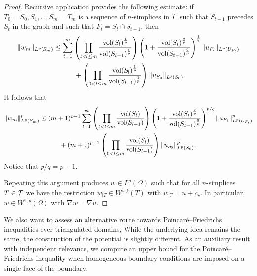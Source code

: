 \documentclass[a4paper]{article}
\begin{document}
\begin{proof}
 Recursive application provides the following estimate:
 if $T_0 = S_0, S_1, \dots, S_m = T_m$ is a sequence of $n$-simplices in ${\mathcal T}$
 such that \color{red}$S_{t-1}$ precedes $S_{t}$ in the graph \color{black} and such that $F_t = S_t \cap S_{t-1}$,
 then 
 \begin{align*}
    \| w_{m} \|_{L^{p}(S_m)}
    &\leq 
    \sum_{t=1}^{m} 
    \left( 
        \prod_{t < l \leq m} 
        \frac{ \operatorname{vol}(S_l)^{\frac 1 p} }{ \operatorname{vol}(S_{l-1})^{\frac 1 p} } 
    \right)
    \left( 1 + \frac{ \operatorname{vol}(S_t)^{\frac q p} }{ \operatorname{vol}(S_{t-1})^{\frac q p} } \right)^{\frac 1 q}
    \| u_{F_t} \|_{L^{p}(U_{F_t})}
    \\&\quad \quad \quad 
    +
    \left( 
        \prod_{0 < l \leq m} 
        \frac{ \operatorname{vol}(S_l)^{\frac 1 p} }{ \operatorname{vol}(S_{l-1})^{\frac 1 p} } 
    \right)
    \| u_{S_0}\|_{L^{p}(S_{0})}
    .
 \end{align*}
 It follows that
 \begin{align*}
    \| w_{m} \|_{L^{p}(S_m)}^{p}
    &\leq 
    (m+1)^{p-1}
    \sum_{t=1}^{m} 
    \left( 
        \prod_{t < l \leq m} 
        \frac{ \operatorname{vol}(S_l) }{ \operatorname{vol}(S_{l-1}) } 
    \right)
    \left( 1 + \frac{ \operatorname{vol}(S_t)^{\frac q p} }{ \operatorname{vol}(S_{t-1})^{\frac q p} } \right)^{p/q}
    \| u_{F_t} \|_{L^{p}(U_{F_t})}^{p}
    \\&\quad \quad \quad 
    +
    (m+1)^{p-1}
    \left( 
        \prod_{0 < l \leq m} 
        \frac{ \operatorname{vol}(S_l) }{ \operatorname{vol}(S_{l-1}) } 
    \right)
    \| u_{S_0}\|_{L^{p}(S_{0})}^{p}
    .
 \end{align*}
 Notice that $p/q = p - 1$.
 
 Repeating this argument produces $w \in L^{p}(\Omega)$ 
 such that for all $n$-simplices $T \in {\mathcal T}$ we have the restriction $w_{|T} \in W^{1,p}(T)$ with $w_{|T} = u + c_{\star}$.
 In particular, $w \in W^{1,p}(\Omega)$ with $\nabla w = \nabla u$.
\end{proof}

We also want to assess an alternative route towards Poincar\'e--Friedrichs inequalities over triangulated domains,
While the underlying idea remains the same, the construction of the potential is slightly different. 
As an auxiliary result with independent relevance, we compute an upper bound for the Poincar\'e--Friedrichs inequality 
when homogeneous boundary conditions are imposed on a single face of the boundary. 
\end{document}
